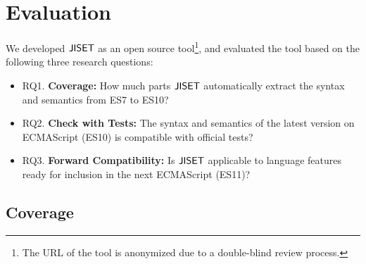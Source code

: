 \section{Evaluation}\label{sec:eval}

We developed \( \text{\sf JISET} \) as an open source tool\footnote{The URL of the tool is
anonymized due to a double-blind review process.}, and evaluated the tool
based on the following three research questions:
\begin{itemize}[leftmargin=0.5cm]
\item RQ1. \textbf{Coverage:} How much parts \( \text{\sf JISET} \) automatically extract
the syntax and semantics from ES7 to ES10?
\item RQ2. \textbf{Check with Tests:} The syntax and semantics of the latest
version on ECMAScript (ES10) is compatible with official tests?
\item RQ3. \textbf{Forward Compatibility:} Is \( \text{\sf JISET} \) applicable to language
features ready for inclusion in the next ECMAScript (ES11)?
\end{itemize}


\subsection{Coverage}

